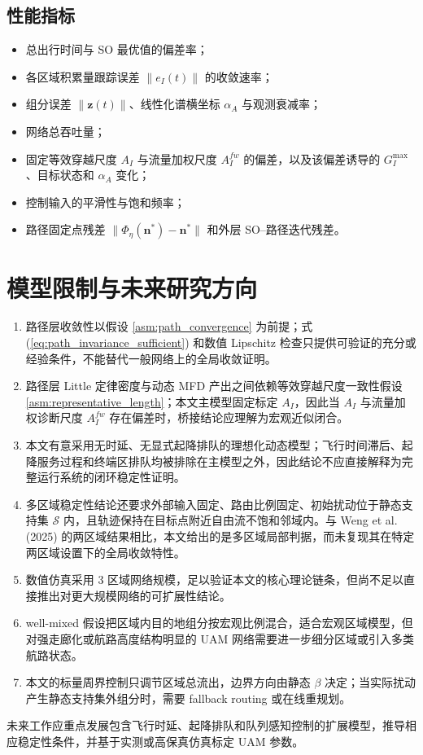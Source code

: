 \documentclass[a4paper,12pt]{article}
\theoremstyle{plain}
\theoremstyle{definition}
\theoremstyle{remark}
\begin{document}
\subsection{性能指标}
\begin{itemize}
    \item 总出行时间与 SO 最优值的偏差率；
    \item 各区域积累量跟踪误差 $\|e_I(t)\|$ 的收敛速率；
    \item 组分误差 $\|\bm z(t)\|$、线性化谱横坐标 $\alpha_A$ 与观测衰减率；
    \item 网络总吞吐量；
    \item 固定等效穿越尺度 $A_I$ 与流量加权尺度 $A_I^{fw}$ 的偏差，以及该偏差诱导的 $G_I^{\max}$、目标状态和 $\alpha_A$ 变化；
    \item 控制输入的平滑性与饱和频率；
    \item 路径固定点残差 $\|\Phi_\eta(\bm n^*)-\bm n^*\|$ 和外层 SO--路径迭代残差。
\end{itemize}

\section{模型限制与未来研究方向}

\begin{enumerate}
    \item 路径层收敛性以假设 \ref{asm:path_convergence} 为前提；式 (\ref{eq:path_invariance_sufficient}) 和数值 Lipschitz 检查只提供可验证的充分或经验条件，不能替代一般网络上的全局收敛证明。
    \item 路径层 Little 定律密度与动态 MFD 产出之间依赖等效穿越尺度一致性假设 \ref{asm:representative_length}；本文主模型固定标定 $A_I$，因此当 $A_I$ 与流量加权诊断尺度 $A_I^{fw}$ 存在偏差时，桥接结论应理解为宏观近似闭合。
    \item 本文有意采用无时延、无显式起降排队的理想化动态模型；飞行时间滞后、起降服务过程和终端区排队均被排除在主模型之外，因此结论不应直接解释为完整运行系统的闭环稳定性证明。
    \item 多区域稳定性结论还要求外部输入固定、路由比例固定、初始扰动位于静态支持集 $\mathcal S$ 内，且轨迹保持在目标点附近自由流不饱和邻域内。与 Weng et al. (2025) 的两区域结果相比，本文给出的是多区域局部判据，而未复现其在特定两区域设置下的全局收敛特性。
    \item 数值仿真采用 3 区域网络规模，足以验证本文的核心理论链条，但尚不足以直接推出对更大规模网络的可扩展性结论。
    \item well-mixed 假设把区域内目的地组分按宏观比例混合，适合宏观区域模型，但对强走廊化或航路高度结构明显的 UAM 网络需要进一步细分区域或引入多类航路状态。
    \item 本文的标量周界控制只调节区域总流出，边界方向由静态 $\beta$ 决定；当实际扰动产生静态支持集外组分时，需要 fallback routing 或在线重规划。
\end{enumerate}

未来工作应重点发展包含飞行时延、起降排队和队列感知控制的扩展模型，推导相应稳定性条件，并基于实测或高保真仿真标定 UAM 参数。
\end{document}

